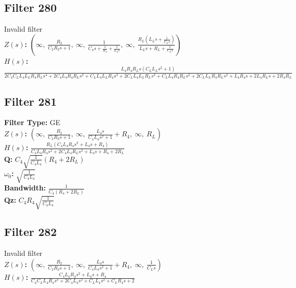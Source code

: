 \documentclass{article}
\begin{document}
\subsection*{Filter 280}
Invalid filter \\ 
\textbf{$Z(s)$:} $\left( \infty, \  \frac{R_{2}}{C_{2} R_{2} s + 1}, \  \infty, \  \frac{1}{C_{4} s + \frac{1}{R_{4}} + \frac{1}{L_{4} s}}, \  \infty, \  \frac{R_{L} \left(L_{L} s + \frac{1}{C_{L} s}\right)}{L_{L} s + R_{L} + \frac{1}{C_{L} s}}\right)$ \\ 
\textbf{$H(s)$:} $\frac{L_{4} R_{4} R_{L} s \left(C_{L} L_{L} s^{2} + 1\right)}{2 C_{4} C_{L} L_{4} L_{L} R_{4} R_{L} s^{4} + 2 C_{4} L_{4} R_{4} R_{L} s^{2} + C_{L} L_{4} L_{L} R_{4} s^{3} + 2 C_{L} L_{4} L_{L} R_{L} s^{3} + C_{L} L_{4} R_{4} R_{L} s^{2} + 2 C_{L} L_{L} R_{4} R_{L} s^{2} + L_{4} R_{4} s + 2 L_{4} R_{L} s + 2 R_{4} R_{L}}$ \\ 
\subsection*{Filter 281}
\textbf{Filter Type:} GE \\ 
\textbf{$Z(s)$:} $\left( \infty, \  \frac{R_{2}}{C_{2} R_{2} s + 1}, \  \infty, \  \frac{L_{4} s}{C_{4} L_{4} s^{2} + 1} + R_{4}, \  \infty, \  R_{L}\right)$ \\ 
\textbf{$H(s)$:} $\frac{R_{L} \left(C_{4} L_{4} R_{4} s^{2} + L_{4} s + R_{4}\right)}{C_{4} L_{4} R_{4} s^{2} + 2 C_{4} L_{4} R_{L} s^{2} + L_{4} s + R_{4} + 2 R_{L}}$ \\ 
\textbf{Q:} $C_{4} \sqrt{\frac{1}{C_{4} L_{4}}} \left(R_{4} + 2 R_{L}\right)$ \\ 
\textbf{$\omega_0$:} $\sqrt{\frac{1}{C_{4} L_{4}}}$ \\ 
\textbf{Bandwidth:} $\frac{1}{C_{4} \left(R_{4} + 2 R_{L}\right)}$ \\ 
\textbf{Qz:} $C_{4} R_{4} \sqrt{\frac{1}{C_{4} L_{4}}}$ \\ 
\subsection*{Filter 282}
Invalid filter \\ 
\textbf{$Z(s)$:} $\left( \infty, \  \frac{R_{2}}{C_{2} R_{2} s + 1}, \  \infty, \  \frac{L_{4} s}{C_{4} L_{4} s^{2} + 1} + R_{4}, \  \infty, \  \frac{1}{C_{L} s}\right)$ \\ 
\textbf{$H(s)$:} $\frac{C_{4} L_{4} R_{4} s^{2} + L_{4} s + R_{4}}{C_{4} C_{L} L_{4} R_{4} s^{3} + 2 C_{4} L_{4} s^{2} + C_{L} L_{4} s^{2} + C_{L} R_{4} s + 2}$ \\ 
\end{document}
